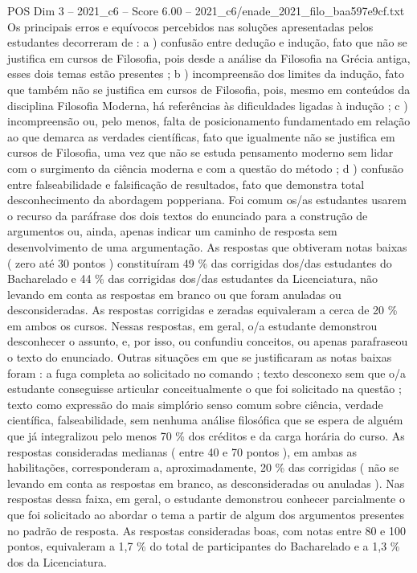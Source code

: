 \begin{textsample}{POS Dim 3 – 2021\_c6 – Score 6.00 – 2021\_c6/enade\_2021\_filo\_baa597e9cf.txt}
Os principais erros e equívocos percebidos nas soluções apresentadas pelos estudantes decorreram de : a ) confusão entre dedução e indução, fato que não se justifica em cursos de Filosofia, pois desde a análise da Filosofia na Grécia antiga, esses dois temas estão presentes ; b ) incompreensão dos limites da indução, fato que também não se justifica em cursos de Filosofia, pois, mesmo em conteúdos da disciplina Filosofia Moderna, há referências às dificuldades ligadas à indução ; c ) incompreensão ou, pelo menos, falta de posicionamento fundamentado em relação ao que demarca as verdades científicas, fato que igualmente não se justifica em cursos de Filosofia, uma vez que não se estuda pensamento moderno sem lidar com o surgimento da ciência moderna e com a questão do método ; d ) confusão entre falseabilidade e falsificação de resultados, fato que demonstra total desconhecimento da abordagem popperiana.
Foi comum os/as estudantes usarem o recurso da paráfrase dos dois textos do enunciado para a construção de argumentos ou, ainda, apenas indicar um caminho de resposta sem desenvolvimento de uma argumentação.
As respostas que obtiveram notas baixas ( zero até 30 pontos ) constituíram 49 \% das corrigidas dos/das estudantes do Bacharelado e 44 \% das corrigidas dos/das estudantes da Licenciatura, não levando em conta as respostas em branco ou que foram anuladas ou desconsideradas.
As respostas corrigidas e zeradas equivaleram a cerca de 20 \% em ambos os cursos.
Nessas respostas, em geral, o/a estudante demonstrou desconhecer o assunto, e, por isso, ou confundiu conceitos, ou apenas parafraseou o texto do enunciado.
Outras situações em que se justificaram as notas baixas foram : a fuga completa ao solicitado no comando ; texto desconexo sem que o/a estudante conseguisse articular conceitualmente o que foi solicitado na questão ; texto como expressão do mais simplório senso comum sobre ciência, verdade científica, falseabilidade, sem nenhuma análise filosófica que se espera de alguém que já integralizou pelo menos 70 \% dos créditos e da carga horária do curso.
As respostas consideradas medianas ( entre 40 e 70 pontos ), em ambas as habilitações, corresponderam a, aproximadamente, 20 \% das corrigidas ( não se levando em conta as respostas em branco, as desconsideradas ou anuladas ).
Nas respostas dessa faixa, em geral, o estudante demonstrou conhecer parcialmente o que foi solicitado ao abordar o tema a partir de algum dos argumentos presentes no padrão de resposta.
As respostas consideradas boas, com notas entre 80 e 100 pontos, equivaleram a 1,7 \% do total de participantes do Bacharelado e a 1,3 \% dos da Licenciatura.

\end{textsample}
